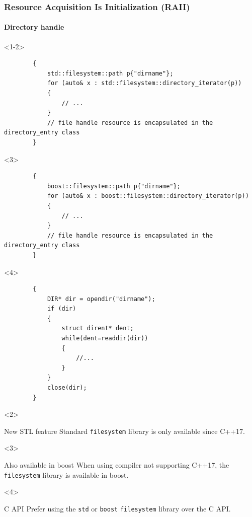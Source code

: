 \documentclass{beamer}
\begin{document}
\begin{frame}[fragile,t]
\frametitle{Resource Acquisition Is Initialization (RAII)}
\framesubtitle{Directory handle}
    \begin{onlyenv}<1-2>
    \begin{lstlisting}
        {
            std::filesystem::path p{"dirname"};
            for (auto& x : std::filesystem::directory_iterator(p))
            {
                // ...
            }
            // file handle resource is encapsulated in the directory_entry class
        }
    \end{lstlisting}
    \end{onlyenv}

    \begin{onlyenv}<3>
    \begin{lstlisting}
        {
            boost::filesystem::path p{"dirname"};
            for (auto& x : boost::filesystem::directory_iterator(p))
            {
                // ...
            }
            // file handle resource is encapsulated in the directory_entry class
        }
    \end{lstlisting}
    \end{onlyenv}

    \begin{onlyenv}<4>
    \begin{lstlisting}
        {
            DIR* dir = opendir("dirname");
            if (dir)
            {
                struct dirent* dent;
                while(dent=readdir(dir))
                {
                    //...
                }
            }
            close(dir);
        }
    \end{lstlisting}
    \end{onlyenv}

    \begin{onlyenv}<2>
    \begin{block}{New STL feature}
        Standard \texttt{filesystem} library is only available since C++17.
    \end{block}
    \end{onlyenv}

    \begin{onlyenv}<3>
    \begin{block}{Also available in boost}
        When using compiler not supporting C++17, the \texttt{filesystem} library is available in boost.
    \end{block}
    \end{onlyenv}

    \begin{onlyenv}<4>
    \begin{alertblock}{C API}
        Prefer using the \texttt{std} or \texttt{boost} \texttt{filesystem} library over the C API. 
    \end{alertblock}
    \end{onlyenv}
\end{frame}
\end{document}
